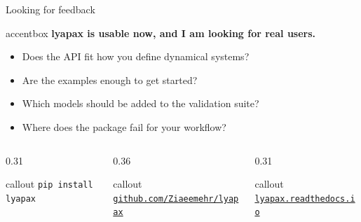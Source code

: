 \documentclass[aspectratio=169]{beamer}
\newcommand{\whitebox}[1]{%
  \begin{beamercolorbox}[rounded=true,wd=\linewidth,sep=0.18cm]{callout}
    #1
  \end{beamercolorbox}
}
\newcommand{\accentbox}[1]{%
  \begin{beamercolorbox}[rounded=true,wd=\linewidth,sep=0.20cm]{accentbox}
    #1
  \end{beamercolorbox}
}
\begin{document}
\begin{frame}{Looking for feedback}
\accentbox{\Large\textbf{lyapax is usable now, and I am looking for real users.}}

\vspace{0.35cm}
\normalsize
\begin{itemize}
  \item Does the API fit how you define dynamical systems?
  \item Are the examples enough to get started?
  \item Which models should be added to the validation suite?
  \item Where does the package fail for your workflow?
\end{itemize}

\vspace{0.25cm}
\begin{columns}[T,onlytextwidth]
\begin{column}{0.31\linewidth}
\whitebox{\centering\texttt{pip install lyapax}}
\end{column}
\begin{column}{0.36\linewidth}
\whitebox{\centering\scriptsize\href{https://github.com/Ziaeemehr/lyapax}{\texttt{github.com/Ziaeemehr/lyapax}}}
\end{column}
\begin{column}{0.31\linewidth}
\whitebox{\centering\scriptsize\href{https://lyapax.readthedocs.io}{\texttt{lyapax.readthedocs.io}}}
\end{column}
\end{columns}
\end{frame}
\end{document}
